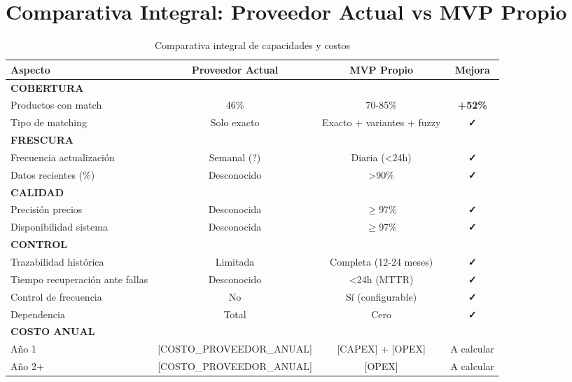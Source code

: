 \documentclass[12pt,a4paper]{article}
\begin{document}
\newpage
\section{Comparativa Integral: Proveedor Actual vs MVP Propio}

\begin{table}[h]
\centering
\small
\begin{tabularx}{\textwidth}{|X|c|c|c|}
\hline
\rowcolor{lightgray}
\textbf{Aspecto} & \textbf{Proveedor Actual} & \textbf{MVP Propio} & \textbf{Mejora} \\
\hline
\textbf{COBERTURA} & & & \\
\hline
Productos con match & 46\% & 70-85\% & \textcolor{successgreen}{\textbf{+52\%}} \\
\hline
Tipo de matching & Solo exacto & Exacto + variantes + fuzzy & \textcolor{successgreen}{\textbf{✓}} \\
\hline
\textbf{FRESCURA} & & & \\
\hline
Frecuencia actualización & Semanal (?) & Diaria (<24h) & \textcolor{successgreen}{\textbf{✓}} \\
\hline
Datos recientes (\%) & Desconocido & >90\% & \textcolor{successgreen}{\textbf{✓}} \\
\hline
\textbf{CALIDAD} & & & \\
\hline
Precisión precios & Desconocida & $\geq$97\% & \textcolor{successgreen}{\textbf{✓}} \\
\hline
Disponibilidad sistema & Desconocida & $\geq$97\% & \textcolor{successgreen}{\textbf{✓}} \\
\hline
\textbf{CONTROL} & & & \\
\hline
Trazabilidad histórica & Limitada & Completa (12-24 meses) & \textcolor{successgreen}{\textbf{✓}} \\
\hline
Tiempo recuperación ante fallas & Desconocido & <24h (MTTR) & \textcolor{successgreen}{\textbf{✓}} \\
\hline
Control de frecuencia & No & Sí (configurable) & \textcolor{successgreen}{\textbf{✓}} \\
\hline
Dependencia & Total & Cero & \textcolor{successgreen}{\textbf{✓}} \\
\hline
\textbf{COSTO ANUAL} & & & \\
\hline
Año 1 & [COSTO\_PROVEEDOR\_ANUAL] & [CAPEX] + [OPEX] & A calcular \\
\hline
Año 2+ & [COSTO\_PROVEEDOR\_ANUAL] & [OPEX] & A calcular \\
\hline
\end{tabularx}
\caption{Comparativa integral de capacidades y costos}
\end{table}
\end{document}
